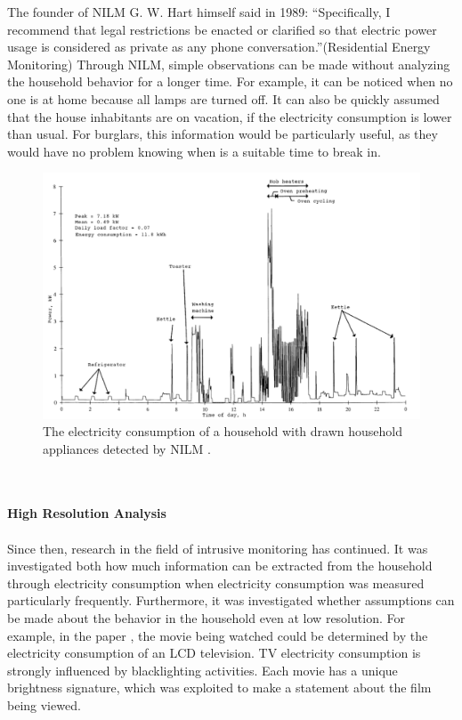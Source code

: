The founder of \gls{NILM} G. W. Hart himself said in 1989: ``Specifically, I recommend that legal restrictions be enacted or clarified so that electric power usage is considered as private as any phone conversation.''(Residential Energy Monitoring)
Through \gls{NILM}, simple observations can be made without analyzing the household behavior for a longer time. For example, it can be noticed when no one is at home because all lamps are turned off. It can also be quickly assumed that the house inhabitants are on vacation, if the electricity consumption is lower than usual. For burglars, this information would be particularly useful, as they would have no problem knowing when is a suitable time to break in.
\begin{figure}[tbp]
  \centering
  \includegraphics[width=1\textwidth]{images/nilm.png}
  \caption[Detected NILM Appliances]{The electricity consumption of a household with drawn household appliances detected by \gls{NILM} \cite{quinn2009privacy}.}
  \label{fig:Nilm}
\end{figure}
\\
\\
\textbf{High Resolution Analysis}
\\
\\
Since then, research in the field of intrusive monitoring has continued. It was investigated both how much information can be extracted from the household through electricity consumption when electricity consumption was measured particularly frequently. Furthermore, it was investigated whether assumptions can be made about the behavior in the household even at low resolution.
For example, in the paper \cite{greveler2012multimedia}, the movie being watched could be determined by the electricity consumption of an LCD television. TV electricity consumption is strongly influenced by blacklighting activities. Each movie has a unique brightness signature, which was exploited to make a statement about the film being viewed.\\
